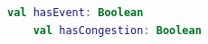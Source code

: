 \begin{lstlisting}[language=Kotlin, caption={Variables opcionales}]
	val hasEvent: Boolean
	val hasCongestion: Boolean
\end{lstlisting}

